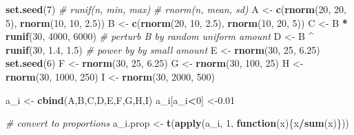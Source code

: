 \documentclass[onecolumn]{article}
\newenvironment{Shaded}{\begin{snugshade}}{\end{snugshade}}
\newcommand{\CommentTok}[1]{\textcolor[rgb]{0.56,0.35,0.01}{\textit{#1}}}
\newcommand{\ControlFlowTok}[1]{\textcolor[rgb]{0.13,0.29,0.53}{\textbf{#1}}}
\newcommand{\DecValTok}[1]{\textcolor[rgb]{0.00,0.00,0.81}{#1}}
\newcommand{\FloatTok}[1]{\textcolor[rgb]{0.00,0.00,0.81}{#1}}
\newcommand{\KeywordTok}[1]{\textcolor[rgb]{0.13,0.29,0.53}{\textbf{#1}}}
\newcommand{\NormalTok}[1]{#1}
\newcommand{\OperatorTok}[1]{\textcolor[rgb]{0.81,0.36,0.00}{\textbf{#1}}}
\newcommand{\StringTok}[1]{\textcolor[rgb]{0.31,0.60,0.02}{#1}}
\begin{document}
\begin{Shaded}
\begin{Highlighting}[]
\KeywordTok{set.seed}\NormalTok{(}\DecValTok{7}\NormalTok{)}
\CommentTok{# runif(n, min, max)}
\CommentTok{# rnorm(n, mean, sd)}
\NormalTok{A <-}\StringTok{ }\KeywordTok{c}\NormalTok{(}\KeywordTok{rnorm}\NormalTok{(}\DecValTok{20}\NormalTok{, }\DecValTok{20}\NormalTok{, }\DecValTok{5}\NormalTok{), }\KeywordTok{rnorm}\NormalTok{(}\DecValTok{10}\NormalTok{, }\DecValTok{10}\NormalTok{, }\FloatTok{2.5}\NormalTok{))}
\NormalTok{B <-}\StringTok{ }\KeywordTok{c}\NormalTok{(}\KeywordTok{rnorm}\NormalTok{(}\DecValTok{20}\NormalTok{, }\DecValTok{10}\NormalTok{, }\FloatTok{2.5}\NormalTok{), }\KeywordTok{rnorm}\NormalTok{(}\DecValTok{10}\NormalTok{, }\DecValTok{20}\NormalTok{, }\DecValTok{5}\NormalTok{))}
\NormalTok{C <-}\StringTok{ }\NormalTok{B }\OperatorTok{*}\StringTok{ }\KeywordTok{runif}\NormalTok{(}\DecValTok{30}\NormalTok{, }\DecValTok{4000}\NormalTok{, }\DecValTok{6000}\NormalTok{) }\CommentTok{# perturb B by random uniform amount}
\NormalTok{D <-}\StringTok{ }\NormalTok{B }\OperatorTok{^}\StringTok{ }\KeywordTok{runif}\NormalTok{(}\DecValTok{30}\NormalTok{, }\FloatTok{1.4}\NormalTok{, }\FloatTok{1.5}\NormalTok{) }\CommentTok{# power by by small amount}
\NormalTok{E <-}\StringTok{ }\KeywordTok{rnorm}\NormalTok{(}\DecValTok{30}\NormalTok{, }\DecValTok{25}\NormalTok{, }\FloatTok{6.25}\NormalTok{)}
\KeywordTok{set.seed}\NormalTok{(}\DecValTok{6}\NormalTok{)}
\NormalTok{F <-}\StringTok{ }\KeywordTok{rnorm}\NormalTok{(}\DecValTok{30}\NormalTok{, }\DecValTok{25}\NormalTok{, }\FloatTok{6.25}\NormalTok{)}
\NormalTok{G <-}\StringTok{ }\KeywordTok{rnorm}\NormalTok{(}\DecValTok{30}\NormalTok{, }\DecValTok{100}\NormalTok{, }\DecValTok{25}\NormalTok{)}
\NormalTok{H <-}\StringTok{ }\KeywordTok{rnorm}\NormalTok{(}\DecValTok{30}\NormalTok{, }\DecValTok{1000}\NormalTok{, }\DecValTok{250}\NormalTok{)}
\NormalTok{I <-}\StringTok{ }\KeywordTok{rnorm}\NormalTok{(}\DecValTok{30}\NormalTok{, }\DecValTok{2000}\NormalTok{, }\DecValTok{500}\NormalTok{)}

\NormalTok{a_i <-}\StringTok{ }\KeywordTok{cbind}\NormalTok{(A,B,C,D,E,F,G,H,I)}
\NormalTok{a_i[a_i}\OperatorTok{<}\DecValTok{0}\NormalTok{] <-}\FloatTok{0.01}

\CommentTok{# convert to proportions}
\NormalTok{a_i.prop <-}\StringTok{ }\KeywordTok{t}\NormalTok{(}\KeywordTok{apply}\NormalTok{(a_i, }\DecValTok{1}\NormalTok{, }\ControlFlowTok{function}\NormalTok{(x)\{x}\OperatorTok{/}\KeywordTok{sum}\NormalTok{(x)\}))}


\end{Highlighting}
\end{Shaded}
\end{document}
